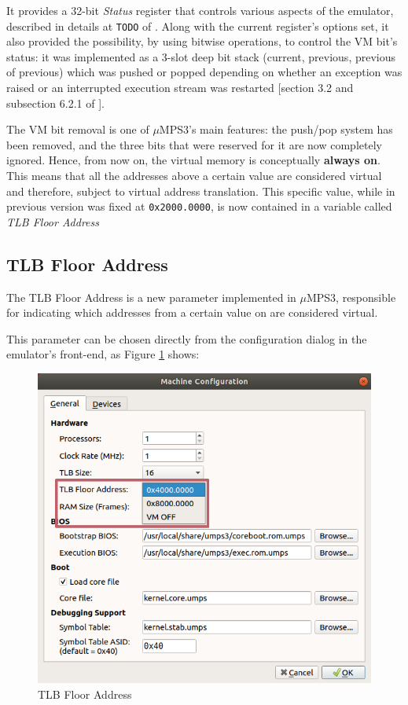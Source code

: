 \documentclass[12pt,a4paper,openright,twoside]{report}
\begin{document}
  It provides a 32-bit \textit{Status} register that controls various aspects of the emulator, described in details at \texttt{TODO} of \cite{pops}.
  Along with the current register's options set, it also provided the possibility, by using bitwise operations, to control the VM bit's status: it was implemented as a 3-slot deep bit stack (current, previous, previous of previous) which was pushed or popped depending on whether an exception was raised or an interrupted execution stream was restarted [section 3.2 and subsection 6.2.1 of \cite{old_pops}].
  
  The VM bit removal is one of $\mu$MPS3's main features: the push/pop system has been removed, and the three bits that were reserved for it are now completely ignored. 
  Hence, from now on, the virtual memory is conceptually \textbf{always on}.
  This means that all the addresses above a certain value are considered virtual and therefore, subject to virtual address translation.
  This specific value, while in previous version was fixed at \texttt{0x2000.0000}, is now contained in a variable called \textit{TLB Floor Address}
  
\subsection{TLB Floor Address}
\label{chap:tlb_floor_address}
  The TLB Floor Address is a new parameter implemented in $\mu$MPS3, responsible for indicating which addresses from a certain value on are considered virtual.
  
  This parameter can be chosen directly from the configuration dialog in the emulator's front-end, as Figure \ref{fig:tlb_floor_address} shows:
  \begin{figure}[h]
  \centering
  \includegraphics[scale=0.73]{tlb_floor_address}
  \caption{TLB Floor Address}
  \label{fig:tlb_floor_address}
  \end{figure}
\end{document}
